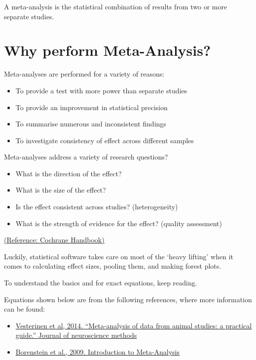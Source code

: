 \documentclass[
]{book}
\providecommand{\tightlist}{%
  \setlength{\itemsep}{0pt}\setlength{\parskip}{0pt}}
\begin{document}
A meta-analysis is the statistical combination of results from two or more separate studies.

\hypertarget{why-perform-meta-analysis}{%
\section{Why perform Meta-Analysis?}\label{why-perform-meta-analysis}}

Meta-analyses are performed for a variety of reasons:

\begin{itemize}
\tightlist
\item
  To provide a test with more power than separate studies
\item
  To provide an improvement in statistical precision
\item
  To summarise numerous and inconsistent findings
\item
  To investigate consistency of effect across different samples
\end{itemize}

Meta-analyses address a variety of research questions?

\begin{itemize}
\tightlist
\item
  What is the direction of the effect?
\item
  What is the size of the effect?
\item
  Is the effect consistent across studies? (heterogeneity)
\item
  What is the strength of evidence for the effect? (quality assessment)
\end{itemize}

\href{https://training.cochrane.org/handbook/current}{(Reference: Cochrane Handbook)}

Luckily, statistical software takes care on most of the `heavy lifting' when it comes to calculating effect sizes, pooling them, and making forest plots.

To understand the basics and for exact equations, keep reading.

Equations shown below are from the following references, where more information can be found:

\begin{itemize}
\tightlist
\item
  \href{https://doi.org/10.1016/j.jneumeth.2013.09.010}{Vesterinen et al, 2014. ``Meta-analysis of data from animal studies: a practical guide.'' Journal of neuroscience methods}
\item
  \href{https://doi.org/10.1002/9780470743386}{Borenstein et al., 2009. Introduction to Meta-Analysis}
\end{itemize}
\end{document}
